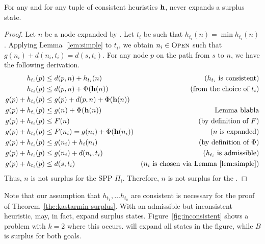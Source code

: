 
\begin{theorem}
  \label{the:kastarmin-surplus}
  For any \kgs and for any tuple of consistent heuristics $\mathbf{h}$, \kastarmin never expands a surplus state.
\end{theorem}
\begin{proof}
  Let $n$ be a node expanded by \kastarmin.
  Let $t_i$ be such that $h_{t_i}(n) = \min h_{t_i}(n)$.
  Applying Lemma~\ref{lem:simple} to $t_i$, we obtain $n_i \in \textsc{Open}$ such that $g(n_i) + d(n_i, t_i) = d(s, t_i)$.
  For any node $p$ on the path from $s$ to $n$, we have the following derivation.
  \begin{align}
    h_{t_i}(p)        & \leq d(p, n) + h_{t_i}(n)         & \text{($h_{t_i}$ is consistent)}\\
    h_{t_i}(p)        & \leq d(p, n) + \Phi(\mathbf{h}(n))         & \text{(from the choice of $t_i$)}\\
    g(p) + h_{t_i}(p) & \leq g(p) + d(p, n) + \Phi(\mathbf{h}(n)) & \text{}\\
    g(p) + h_{t_i}(p) & \leq g(n) + \Phi(\mathbf{h}(n))          & \text{Lemma blabla}\\
    g(p) + h_{t_i}(p) & \leq F(n)         & \text{(by definition of $F$)}\\
    g(p) + h_{t_i}(p) & \leq F(n_i) = g(n_i) + \Phi(\mathbf{h}(n_i))      & \text{($n$ is expanded)}\\
    g(p) + h_{t_i}(p) & \leq g(n_i) + h_i(n_i) & \text{(by definition of $\Phi$)}\\
    g(p) + h_{t_i}(p) & \leq g(n_i) + d(n_i, t_i) & \text{($h_{t_i}$ is admissible)}\\
    g(p) + h_{t_i}(p) & \leq d(s, t_i) & \text{($n_i$ is chosen via Lemma~\ref{lem:simple})}
    \label{eq:nosurplus}
  \end{align}
  Thus, $n$ is not surplus for the SPP $\Pi_i$.
  Therefore, $n$ is not surplus for the \kgs.
\end{proof}

Note that our assumption that $h_{t_1}, \ldots h_{t_k}$ are consistent is necessary for the proof of Theorem~\ref{the:kastarmin-surplus}.
With an admissible but inconsistent heuristic, \kastarmin may, in fact, expand surplus states.
Figure~\ref{fig:inconsistent} shows a \kgs problem with $k = 2$ where this occurs.
\kastarmin will expand all states in the figure, while $B$ is surplus for both goals.

